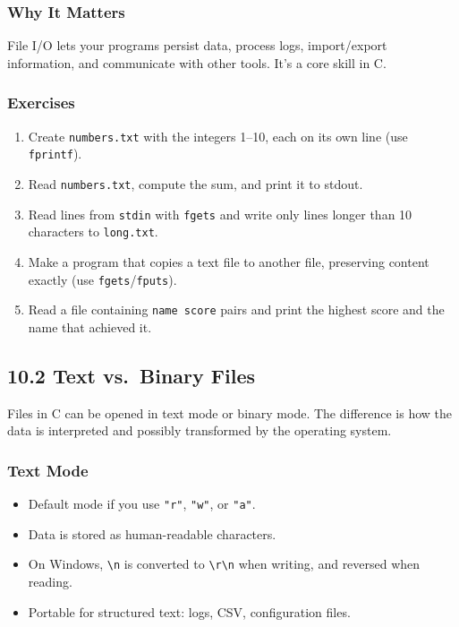 \documentclass[
  letterpaper,
  DIV=11,
  numbers=noendperiod]{scrreprt}
\providecommand{\tightlist}{%
  \setlength{\itemsep}{0pt}\setlength{\parskip}{0pt}}
\begin{document}
\subsubsection{Why It Matters}\label{why-it-matters-44}

File I/O lets your programs persist data, process logs, import/export
information, and communicate with other tools. It's a core skill in C.

\subsubsection{Exercises}\label{exercises-45}

\begin{enumerate}
\def\labelenumi{\arabic{enumi}.}
\tightlist
\item
  Create \texttt{numbers.txt} with the integers 1--10, each on its own
  line (use \texttt{fprintf}).
\item
  Read \texttt{numbers.txt}, compute the sum, and print it to stdout.
\item
  Read lines from \texttt{stdin} with \texttt{fgets} and write only
  lines longer than 10 characters to \texttt{long.txt}.
\item
  Make a program that copies a text file to another file, preserving
  content exactly (use \texttt{fgets}/\texttt{fputs}).
\item
  Read a file containing \texttt{name\ score} pairs and print the
  highest score and the name that achieved it.
\end{enumerate}

\subsection{10.2 Text vs.~Binary Files}\label{text-vs.-binary-files}

Files in C can be opened in text mode or binary mode. The difference is
how the data is interpreted and possibly transformed by the operating
system.

\subsubsection{Text Mode}\label{text-mode}

\begin{itemize}
\tightlist
\item
  Default mode if you use \texttt{"r"}, \texttt{"w"}, or \texttt{"a"}.
\item
  Data is stored as human-readable characters.
\item
  On Windows, \texttt{\textbackslash{}n} is converted to
  \texttt{\textbackslash{}r\textbackslash{}n} when writing, and reversed
  when reading.
\item
  Portable for structured text: logs, CSV, configuration files.
\end{itemize}
\end{document}
